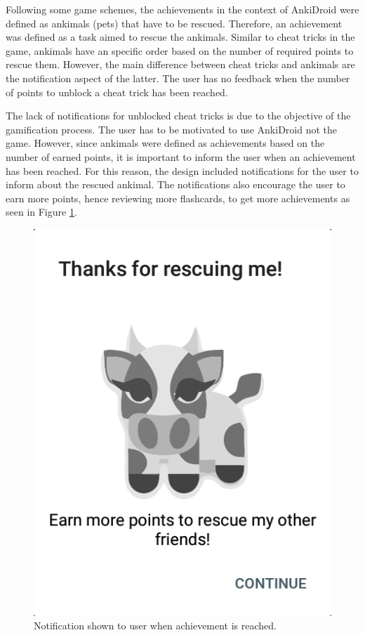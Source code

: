 Following some game schemes, the achievements in the context of AnkiDroid were defined as ankimals (pets) that have to be rescued. Therefore, an achievement was defined as a task aimed to rescue the ankimals. Similar to cheat tricks in the game, ankimals have an specific order based on the number of required points to rescue them. However, the main difference between cheat tricks and ankimals are the notification aspect of the latter. The user has no feedback when the number of points to unblock a cheat trick has been reached.

The lack of notifications for unblocked cheat tricks is due to the objective of the gamification process. The user has to be motivated to use AnkiDroid not the game. However, since ankimals were defined as achievements based on the number of earned points, it is important to inform the user when an achievement has been reached. For this reason, the design included notifications for the user to inform about the rescued ankimal. The notifications also encourage the user to earn more points, hence reviewing more flashcards, to get more achievements as seen in Figure \ref{fig:ankimals-rescue}.

\begin{figure}[htb]
    \vskip 5mm
        \begin{center}
            \includegraphics[scale=0.5]{./Figures/achievement_notification.png}
            \caption{Notification shown to user when achievement is reached.}
            \label{fig:ankimals-rescue}
        \end{center}
    \vskip -5mm
\end{figure}

